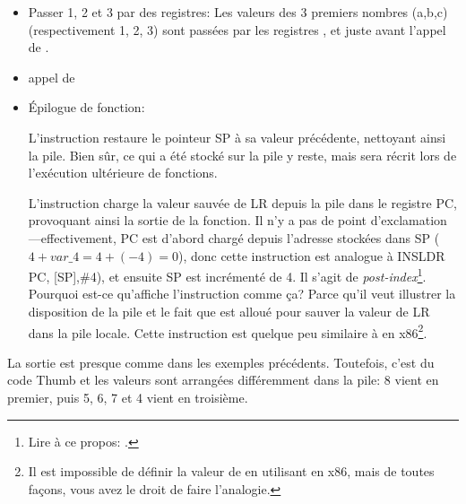 \begin{itemize}
\item Passer 1, 2 et 3 par des registres:
Les valeurs des 3 premiers nombres (a,b,c) (respectivement 1, 2, 3) sont passées
par les registres ,  et  juste avant l'appel de \printf.

\item appel de \printf

\item Épilogue de fonction:

L'instruction  restaure le pointeur \ac{SP} à sa valeur
précédente, nettoyant ainsi la pile.
Bien sûr, ce qui a été stocké sur la pile y reste, mais sera récrit lors de
l'exécution ultérieure de fonctions.

L'instruction  charge la valeur sauvée de \ac{LR}
depuis la pile dans le registre \ac{PC}, provoquant ainsi la sortie de la fonction.
Il n'y a pas de point d'exclamation---effectivement, \ac{PC} est d'abord chargé
depuis l'adresse stockées dans \ac{SP} ($4+var\_4=4+(-4)=0$), donc cette instruction
est analogue à INS{LDR PC, [SP],\#4}), et ensuite \ac{SP} est incrémenté de 4.
Il s'agit de \emph{post-index}\footnote{Lire à ce propos: .}.
Pourquoi est-ce qu'\IDA affiche l'instruction comme ça?
Parce qu'il veut illustrer la disposition de la pile et le fait que 
est alloué pour sauver la valeur de \ac{LR} dans la pile locale.
Cette instruction est quelque peu similaire à  en x86\footnote{Il est
impossible de définir la valeur de  en utilisant \POP en x86, mais
de toutes façons, vous avez le droit de faire l'analogie.}.

\end{itemize}

\myparagraph{\OptimizingKeilVI: \ThumbMode}



La sortie est presque comme dans les exemples précédents. Toutefois, c'est du code
Thumb et les valeurs sont arrangées différemment dans la pile:
8 vient en premier, puis 5, 6, 7 et 4 vient en troisième.

\myparagraph{\OptimizingXcodeIV: \ARMMode}

